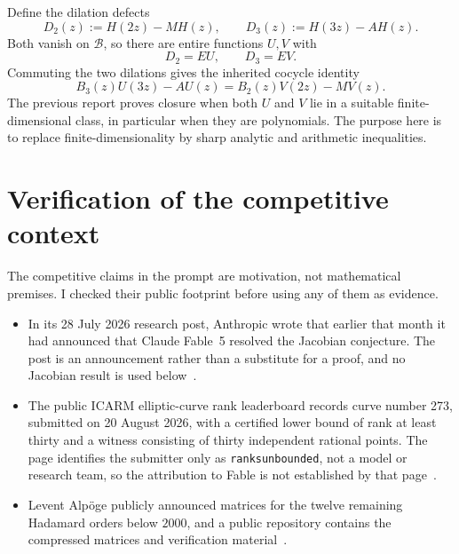 \documentclass[11pt]{article}
\theoremstyle{definition}
\newcommand{\cB}{\mathcal B}
\begin{document}
Define the dilation defects
\begin{equation}\label{eq:defects}
  D_2(z):=H(2z)-M H(z),
  \qquad
  D_3(z):=H(3z)-A H(z).
\end{equation}
Both vanish on \(\cB\), so there are entire functions \(U,V\) with
\begin{equation}\label{eq:quotients}
  D_2=EU,
  \qquad
  D_3=EV.
\end{equation}
Commuting the two dilations gives the inherited cocycle identity
\begin{equation}\label{eq:cocycle}
  B_3(z)U(3z)-A U(z)
   =B_2(z)V(2z)-M V(z).
\end{equation}
The previous report proves closure when both \(U\) and \(V\) lie in a suitable finite-dimensional class, in particular when they are polynomials.  The purpose here is to replace finite-dimensionality by sharp analytic and arithmetic inequalities.

\section{Verification of the competitive context}

The competitive claims in the prompt are motivation, not mathematical premises.  I checked their public footprint before using any of them as evidence.

\begin{itemize}
\item In its 28 July 2026 research post, Anthropic wrote that earlier that month it had announced that Claude Fable~5 resolved the Jacobian conjecture.  The post is an announcement rather than a substitute for a proof, and no Jacobian result is used below~\cite{AnthropicVend2}.
\item The public ICARM elliptic-curve rank leaderboard records curve number 273, submitted on 20 August 2026, with a certified lower bound of rank at least thirty and a witness consisting of thirty independent rational points.  The page identifies the submitter only as \texttt{ranksunbounded}, not a model or research team, so the attribution to Fable is not established by that page~\cite{DujellaRank30}.
\item Levent Alp\"oge publicly announced matrices for the twelve remaining Hadamard orders below \(2000\), and a public repository contains the compressed matrices and verification material~\cite{AlpogeHadamardPost,HadamardMatricesRepo}.
\end{itemize}
\end{document}
